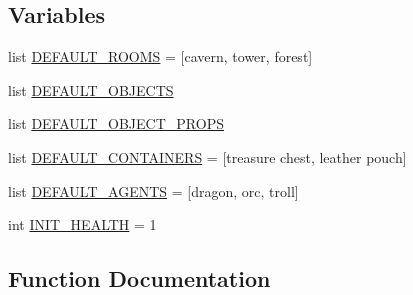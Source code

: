 \subsection*{Variables}
\begin{DoxyCompactItemize}
\item 
list \hyperlink{namespacemastering__the__dungeon_1_1tasks_1_1graph__world2_1_1graph_a5f7fb2863f67d539b18dc9544f98e6f0}{D\+E\+F\+A\+U\+L\+T\+\_\+\+R\+O\+O\+MS} = \mbox{[}\textquotesingle{}cavern\textquotesingle{}, \textquotesingle{}tower\textquotesingle{}, \textquotesingle{}forest\textquotesingle{}\mbox{]}
\item 
list \hyperlink{namespacemastering__the__dungeon_1_1tasks_1_1graph__world2_1_1graph_a454b9acae4b1cf5b4b92287fbcba46ec}{D\+E\+F\+A\+U\+L\+T\+\_\+\+O\+B\+J\+E\+C\+TS}
\item 
list \hyperlink{namespacemastering__the__dungeon_1_1tasks_1_1graph__world2_1_1graph_a0a85aba8bf4da1c3bde4827261a770c0}{D\+E\+F\+A\+U\+L\+T\+\_\+\+O\+B\+J\+E\+C\+T\+\_\+\+P\+R\+O\+PS}
\item 
list \hyperlink{namespacemastering__the__dungeon_1_1tasks_1_1graph__world2_1_1graph_a5b6aec72993e2c1acbd6d44964859796}{D\+E\+F\+A\+U\+L\+T\+\_\+\+C\+O\+N\+T\+A\+I\+N\+E\+RS} = \mbox{[}\textquotesingle{}treasure chest\textquotesingle{}, \textquotesingle{}leather pouch\textquotesingle{}\mbox{]}
\item 
list \hyperlink{namespacemastering__the__dungeon_1_1tasks_1_1graph__world2_1_1graph_a4ce021e5ebf31913eb0b2815c040ba94}{D\+E\+F\+A\+U\+L\+T\+\_\+\+A\+G\+E\+N\+TS} = \mbox{[}\textquotesingle{}dragon\textquotesingle{}, \textquotesingle{}orc\textquotesingle{}, \textquotesingle{}troll\textquotesingle{}\mbox{]}
\item 
int \hyperlink{namespacemastering__the__dungeon_1_1tasks_1_1graph__world2_1_1graph_a4b8c546ae75afd8d8accdcc14a1d6814}{I\+N\+I\+T\+\_\+\+H\+E\+A\+L\+TH} = 1
\end{DoxyCompactItemize}


\subsection{Function Documentation}
\mbox{\label{namespacemastering__the__dungeon_1_1tasks_1_1graph__world2_1_1graph_a028692716d5f060d74a3ccdefa42e183}} 
